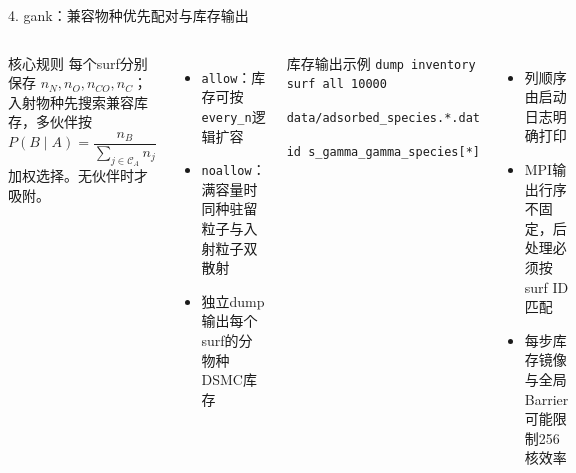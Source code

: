 \documentclass[aspectratio=169,11pt]{ctexbeamer}
\begin{document}
\begin{frame}{4. gank：兼容物种优先配对与库存输出}
  \begin{columns}[T,totalwidth=\textwidth]
    \begin{block}{核心规则}
      每个surf分别保存 $n_N,n_O,n_{CO},n_C$；入射物种先搜索兼容库存，多伙伴按
      \[
        P(B\mid A)=\frac{n_B}{\sum_{j\in\mathcal C_A}n_j}
      \]
      加权选择。无伙伴时才吸附。
    \end{block}
    \begin{itemize}
      \item \texttt{allow}：库存可按\texttt{every\_n}逻辑扩容
      \item \texttt{noallow}：满容量时同种驻留粒子与入射粒子双散射
      \item 独立dump输出每个surf的分物种DSMC库存
    \end{itemize}
    \begin{block}{库存输出示例}
      \small\texttt{dump inventory surf all 10000}\par
      \small\texttt{data/adsorbed\_species.*.dat}\par
      \small\texttt{id s\_gamma\_gamma\_species[*]}
    \end{block}
    \begin{itemize}
      \item 列顺序由启动日志明确打印
      \item MPI输出行序不固定，后处理必须按surf ID匹配
      \item 每步库存镜像与全局Barrier可能限制256核效率
    \end{itemize}
  \end{columns}
\end{frame}
\end{document}
